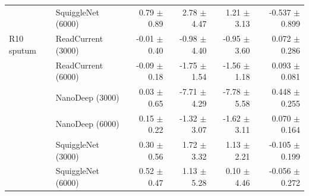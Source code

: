 \begin{tabular}{@{}llrrrr@{}}
 & SquiggleNet (6000) & 0.79 $\pm$ 0.89 & 2.78 $\pm$ 4.47 & 1.21 $\pm$ 3.13 & -0.537 $\pm$ 0.899\\
\addlinespace
R10 sputum & ReadCurrent (3000) & -0.01 $\pm$ 0.40 & -0.98 $\pm$ 4.40 & -0.95 $\pm$ 3.60 & 0.072 $\pm$ 0.286\\
 & ReadCurrent (6000) & -0.09 $\pm$ 0.18 & -1.75 $\pm$ 1.54 & -1.56 $\pm$ 1.18 & 0.093 $\pm$ 0.081\\
 & NanoDeep (3000) & 0.03 $\pm$ 0.65 & -7.71 $\pm$ 4.29 & -7.78 $\pm$ 5.58 & 0.448 $\pm$ 0.255\\
 & NanoDeep (6000) & 0.15 $\pm$ 0.22 & -1.32 $\pm$ 3.07 & -1.62 $\pm$ 3.11 & 0.070 $\pm$ 0.164\\
 & SquiggleNet (3000) & 0.30 $\pm$ 0.56 & 1.72 $\pm$ 3.32 & 1.13 $\pm$ 2.21 & -0.105 $\pm$ 0.199\\
 & SquiggleNet (6000) & 0.52 $\pm$ 0.47 & 1.13 $\pm$ 5.28 & 0.10 $\pm$ 4.46 & -0.056 $\pm$ 0.272\\
\bottomrule\end{tabular}
